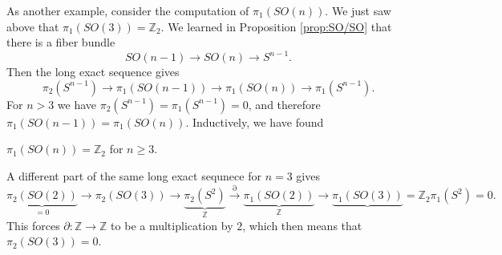 \documentclass[12pt]{article}
\numberwithin{equation}{section}
\theoremstyle{remark}
\def\bZ{\mathbb{Z}}
\begin{document}
As another example, consider the computation of $\pi_1(SO(n))$.
We just saw above that $\pi_1(SO(3))=\bZ_2$.
We learned in Proposition \ref{prop:SO/SO} that there is a fiber bundle
\begin{equation}
SO(n-1)\to SO(n)\to S^{n-1}.
\end{equation} Then the long exact sequence gives
\begin{equation}
  \pi_2(S^{n-1})\to \pi_1(SO(n-1))\to \pi_1(SO(n))\to \pi_1(S^{n-1}).
\end{equation}
For $n>  3$ we have $\pi_{2}(S^{n-1})=\pi_1(S^{n-1})=0$, and therefore $\pi_1(SO(n-1))=\pi_1(SO(n))$.
Inductively, we have found 
\begin{example}
  \label{ex:pi1SOn}
$\pi_1(SO(n))=\bZ_2$ for $n\ge 3$.
\end{example}


A different part of the same long exact sequnece for $n=3$ gives \begin{equation}
  \underbrace{\pi_2(SO(2))}_{=0}
  \to \pi_2(SO(3)) 
  \to \underbrace{\pi_2(S^2)}_{\bZ}
  \stackrel{\partial}{\longrightarrow}  \underbrace{\pi_1(SO(2))}_{\bZ} \to \underbrace{\pi_1(SO(3))}=\bZ_2  \pi_1(S^2)=0.
\end{equation}
This forces $\partial:\bZ\to \bZ$ to be a multiplication by $2$,
which then means that $\pi_2(SO(3))=0$.
\end{document}
